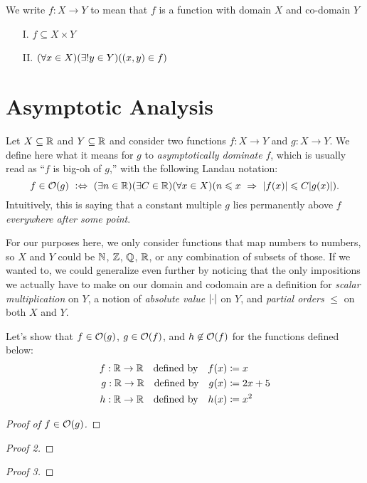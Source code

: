 \begin{definition}[Function]
    We write $f: X \to Y$ to mean that $f$ is a function with domain $X$ and co-domain $Y$ {\ifandonlyif}
    \begin{enumerate}
        \item[I.]
            $f \subseteq X \times Y$
        \item[II.]
            $\pn*{\forall x \in X}\pn*{\exists ! y \in Y}\pn*{(x, y) \in f}$
    \end{enumerate}
\end{definition}

\section{Asymptotic Analysis}
\begin{definition}
    Let $X \subseteq \mathbb{R}$ and $Y \subseteq \mathbb{R}$ and consider two functions $f: X \to Y$ and $g: X \to Y$.
    We define here what it means for $g$ to \emph{asymptotically dominate} $f$,
    which is usually read as ``$f$ is big-oh of $g$,''
    with the following Landau notation:
    \[
        f \in \O{g} \iffdefn \pn*{\exists n \in \R}\pn*{\exists C \in \R}\pn*{\forall x \in X}
                             \pn*{n \leq x \implies \abs{f(x)} \leq C \abs{g(x)}}.
    \]
    Intuitively, this is saying that a constant multiple $g$ lies permanently above $f$
    \emph{everywhere after some point}.

    For our purposes here, we only consider functions that map numbers to numbers,
    so $X$ and $Y$ could be $\mathbb{N}$, $\mathbb{Z}$, $\mathbb{Q}$, $\mathbb{R}$, or any combination of subsets of those.
    If we wanted to, we could generalize even further by noticing that
    the only impositions we actually have to make on our domain and codomain are
    a definition for \emph{scalar multiplication} on $Y$,
    a notion of \emph{absolute value} $\lvert\cdot\rvert$ on $Y$,
    and \emph{partial orders} $\leq$ on both $X$ and $Y$.
\end{definition}

\begin{example}
    Let's show that $f \in \O{g}$, $g \in \O{f}$, and $h \not \in \O{f}$ for the functions defined below:
    \begin{align*}
        f: \mathbb{R} \to \mathbb{R}~~\text{ defined by }~~f(x) &\coloneqq x\\
        g: \mathbb{R} \to \mathbb{R}~~\text{ defined by }~~g(x) &\coloneqq 2x + 5\\
        h: \mathbb{R} \to \mathbb{R}~~\text{ defined by }~~h(x) &\coloneqq x^2
    \end{align*}
    \begin{proof}[Proof of $f \in \O{g}$]
    \end{proof}
    \begin{proof}[Proof 2]
    \end{proof}
    \begin{proof}[Proof 3]
    \end{proof}
\end{example}


